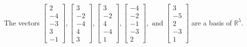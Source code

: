 \begin{exercise}
\begin{exerciseStatement}
  \end{exerciseStatement}
  \begin{exerciseAnswer}
   The vectors \(\left[\begin{array}{r}
2 \\
-4 \\
-3 \\
3 \\
-1
\end{array}\right] , \left[\begin{array}{r}
3 \\
-2 \\
-4 \\
4 \\
3
\end{array}\right] , \left[\begin{array}{r}
3 \\
-2 \\
4 \\
-4 \\
1
\end{array}\right] , \left[\begin{array}{r}
-4 \\
-2 \\
-1 \\
-3 \\
2
\end{array}\right] , \text{ and } \left[\begin{array}{r}
3 \\
-5 \\
2 \\
-3 \\
1
\end{array}\right]\) 
  	 are  a basis of \(\mathbb{R}^5\).
  


  \end{exerciseAnswer}
\end{exercise}